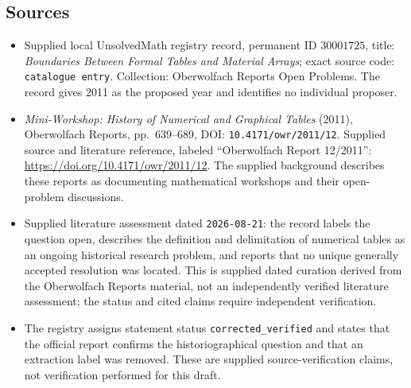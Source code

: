 \documentclass[11pt]{article}
\begin{document}
\subsection{Sources}
\begin{itemize}
\item Supplied local UnsolvedMath registry record, permanent ID \(30001725\), title: \emph{Boundaries Between Formal Tables and Material Arrays}; exact source code: \texttt{catalogue entry}. Collection: Oberwolfach Reports Open Problems. The record gives 2011 as the proposed year and identifies no individual proposer.
\item \emph{Mini-Workshop: History of Numerical and Graphical Tables} (2011), Oberwolfach Reports, pp.~639--689, DOI: \texttt{10.4171/owr/2011/12}. Supplied source and literature reference, labeled ``Oberwolfach Report 12/2011'': \url{https://doi.org/10.4171/owr/2011/12}. The supplied background describes these reports as documenting mathematical workshops and their open-problem discussions.
\item Supplied literature assessment dated \texttt{2026-08-21}: the record labels the question open, describes the definition and delimitation of numerical tables as an ongoing historical research problem, and reports that no unique generally accepted resolution was located. This is supplied dated curation derived from the Oberwolfach Reports material, not an independently verified literature assessment; the status and cited claims require independent verification.
\item The registry assigns statement status \texttt{corrected\_verified} and states that the official report confirms the historiographical question and that an extraction label was removed. These are supplied source-verification claims, not verification performed for this draft.
\end{itemize}
\end{document}
